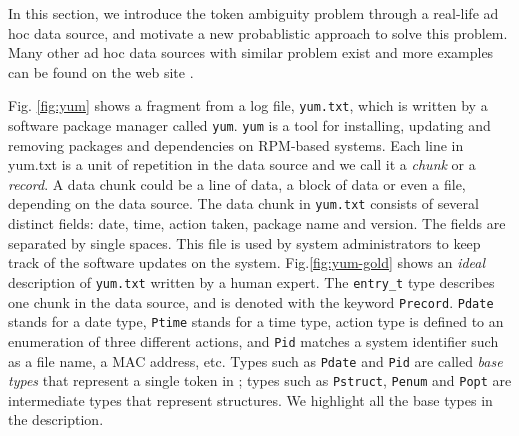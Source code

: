 In this section, we introduce the token ambiguity problem through
a real-life ad hoc data source, and motivate a new probablistic approach
to solve this problem. Many other ad hoc data sources with similar
problem exist and more examples can be found on the \pads{} web site \cite{padsweb}.

Fig. \ref{fig:yum} shows a fragment from a log file, {\tt yum.txt},
which is written by a software package manager called {\tt yum}. {\tt yum} 
is a tool for installing, updating and removing packages and dependencies
on RPM-based systems. 
Each line in yum.txt is a unit of
repetition in the data source and we call it a {\em chunk} or
a {\em record}. A data chunk could be a line of data, a block of data or
even a file, depending on the data source.
The data chunk in {\tt yum.txt} consists of several distinct fields: 
date, time, action taken,
package name and version. The fields are separated by single spaces.
This file is used by system administrators to keep track of the
software updates on the system. 
Fig.\ref{fig:yum-gold} shows an {\em ideal} \pads{} description of
{\tt yum.txt} written by a human expert.
The {\tt entry\_t} type describes one chunk in the data source, and is
denoted with the keyword {\tt Precord}. 
{\tt Pdate} stands for a date type, {\tt Ptime} stands for a time type,
action type is defined to an enumeration of three different actions,
and {\tt Pid} matches a system identifier such as a file
name, a MAC address, etc. Types such as {\tt Pdate} and {\tt Pid}
are called {\em base types} that represent a single token 
in \pads{}; types such as {\tt Pstruct}, {\tt Penum} and {\tt Popt} are 
intermediate types that represent
structures. We highlight all the base types in the \pads{} description. 

